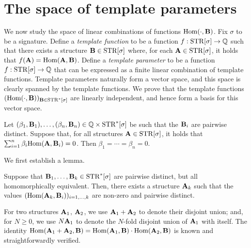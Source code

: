 \documentclass[11pt]{article}
\begin{document}
\section{The space of template parameters}

We now study the space of linear combinations of functions
$\mathrm{Hom}(\cdot, \mathbf{B})$.
Fix $\sigma$ to be a signature.
Define a \emph{template function} to be a function
$f: \mathrm{STR}[\sigma] \to \mathbb{Q}$ such that
there exists a structure $\mathbf{B} \in \mathrm{STR}[\sigma]$
where, for each $\mathbf{A} \in \mathrm{STR}[\sigma]$,
it holds that $f(\mathbf{A}) = \mathrm{Hom}(\mathbf{A},\mathbf{B})$.
Define a \emph{template parameter}
to be a function
$f: \mathrm{STR}[\sigma] \to \mathbb{Q}$ 
that can be expressed as a finite linear combination of
template functions.
Template parameters naturally form a vector space,
and this space is clearly spanned by the template functions.
We prove that the template functions
$(\mathrm{Hom}(\cdot, \mathbf{B}))_{\mathbf{B} \in \mathrm{STR}^*[\sigma]}$
are linearly independent, and hence form a basis for this vector space.

\begin{theorem}
\label{thm:independence}
Let $(\beta_1,\mathbf{B}_1),\ldots,(\beta_n,\mathbf{B}_n) \in \mathbb{Q} \times \mathrm{STR}^*[\sigma]$
be such that the $\mathbf{B}_i$ are pairwise distinct.
Suppose that, for all structures $\mathbf{A} \in \mathrm{STR}[\sigma]$,
it holds that $\sum_{i=1}^n \beta_i \mathrm{Hom}(\mathbf{A},\mathbf{B}_i) = 0$.
Then $\beta_1 = \cdots = \beta_n = 0$.
\end{theorem}

We first establish a lemma.

\begin{lemma}
\label{lemma:lovasz-variant}
Suppose that $\mathbf{B}_1,\ldots,\mathbf{B}_k \in \mathrm{STR}^*[\sigma]$
are pairwise distinct, but all homomorphically equivalent.
Then, there exists a structure $\mathbf{A}_k$
such that the values $(\mathrm{Hom}(\mathbf{A}_k,\mathbf{B}_i))_{i=1,\ldots,k}$
are non-zero and pairwise distinct.
\end{lemma}

For two structures $\mathbf{A}_1$, $\mathbf{A}_2$, we use
$\mathbf{A}_1 + \mathbf{A}_2$ to denote their disjoint union; and,
for $N \geq 0$, we use $N \mathbf{A}_1$ to denote the $N$-fold
disjoint union of $\mathbf{A}_1$ with itself.
The identity
$\mathrm{Hom}(\mathbf{A}_1+\mathbf{A}_2,\mathbf{B}) = \mathrm{Hom}(\mathbf{A}_1,\mathbf{B})\cdot\mathrm{Hom}(\mathbf{A}_2,\mathbf{B})$
is known and straightforwardly verified.
\end{document}
